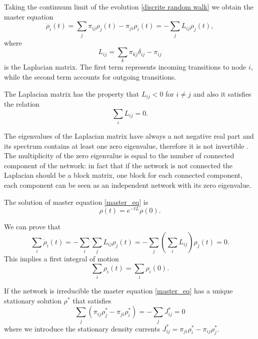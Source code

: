 Taking the continuum limit of the evolution \eqref{discrite random walk} we obtain the master equation \cite{Classic_random_walk}
\begin{equation}\label{master_eq}
    \dot \rho_i(t) = \sum_j \pi_{ij}\rho_j(t) - \pi_{ji}\rho_i(t) = - \sum_j L_{ij} \rho_j(t),
\end{equation}
where 
\begin{equation}\label{Laplacian}
    L_{ij} = \sum_k \pi_{kj}\delta_{ij} -\pi_{ij} 
\end{equation}
 is the Laplacian matrix.
The first term represents incoming transitions to node $i$, while the second term accounts for outgoing transitions.

The Laplacian matrix has the property that $L_{ij} < 0 $ for $i \neq j$ and also it satisfies the relation
\begin{equation}
    \sum_i L_{ij} = 0 .
\end{equation} 

The eigenvalues of the Laplacian matrix have always a not negative real part and its spectrum contains at least one zero eigenvalue, therefore it is not invertible \cite{Boccaletti}. The multiplicity of the zero eigenvalue is equal to the number of connected component of the network: in fact that if the network is not connected the Laplacian should be a block matrix, one block for each connected component, each component can be seen as an independent network with its zero eigenvalue.

The solution of master equation \eqref{master_eq} is
\begin{equation}\label{random_walk_solution}
    \rho(t) = e^{-tL}\rho(0).
\end{equation}

We can prove that
\begin{equation}
    \sum_i \dot\rho_i(t) = - \sum_i \sum_j L_{ij} \rho_j(t) = - \sum_j \left(\sum_i L_{ij}\right) \rho_j(t) = 0 .
\end{equation}
This implies a first integral of motion 
\begin{equation}
    \sum_i \rho_i(t) = \sum_i \rho_i(0) .
\end{equation}


If the network is irreducible the master equation \eqref{master_eq} has a unique stationary solution $\rho^*$ that satisfies
\begin{equation}
    \sum_j (\pi_{ij}\rho_j^\ast-\pi_{ji}\rho_i^\ast)=-\sum_j J^*_{ij}=0
\end{equation}
where we introduce the stationary density currents $J^*_{ij} = \pi_{ji}\rho_i^\ast-\pi_{ij}\rho_j^\ast $.

